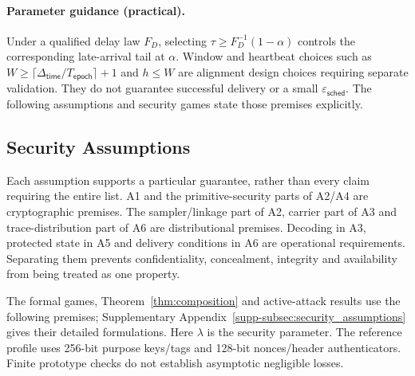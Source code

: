 \documentclass[pdflatex,sn-mathphys-num]{sn-jnl}%
\theoremstyle{definition}
\theoremstyle{game}
\theoremstyle{thmstyleone}%
\theoremstyle{thmstyletwo}%
\theoremstyle{thmstylethree}%
\begin{document}
\paragraph{Parameter guidance (practical).}
Under a qualified delay law $F_D$, selecting
$\tau\ge F_D^{-1}(1-\alpha)$ controls the corresponding late-arrival tail
at $\alpha$. Window and heartbeat choices such as
$W\ge\lceil\Delta_{\mathsf{time}}/T_{\mathsf{epoch}}\rceil+1$ and $h\le W$
are alignment design choices requiring separate validation. They do not
guarantee successful delivery or a small $\varepsilon_{\mathsf{sched}}$.
The following assumptions and security games state those premises explicitly.


\subsection{Security Assumptions}
\label{Assumptions}

Each assumption supports a particular guarantee, rather than every claim
requiring the entire list. A1 and the primitive-security parts of A2/A4
are cryptographic premises. The sampler/linkage part of A2, carrier part
of A3 and trace-distribution part of A6 are distributional premises.
Decoding in A3, protected state in A5 and delivery conditions in A6 are
operational requirements. Separating them prevents confidentiality,
concealment, integrity and availability from being treated as one property.

The formal games, Theorem~\ref{thm:composition} and active-attack results use
the following premises; Supplementary Appendix~\ref{supp-subsec:security_assumptions}
gives their detailed formulations. Here $\lambda$ is the security parameter.
The reference profile uses 256-bit purpose keys/tags and 128-bit
nonces/header authenticators. Finite prototype checks do not establish
asymptotic negligible losses.
\end{document}
